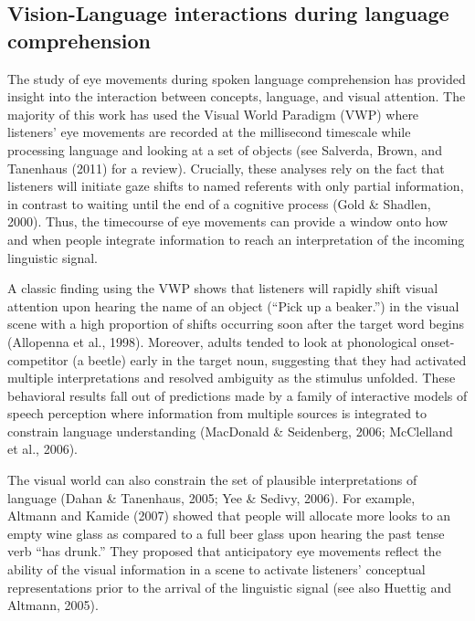 \documentclass[english,floatsintext,man]{apa6}
\begin{document}
\hypertarget{vision-language-interactions-during-language-comprehension}{%
\subsection{Vision-Language interactions during language
comprehension}\label{vision-language-interactions-during-language-comprehension}}

The study of eye movements during spoken language comprehension has
provided insight into the interaction between concepts, language, and
visual attention. The majority of this work has used the Visual World
Paradigm (VWP) where listeners' eye movements are recorded at the
millisecond timescale while processing language and looking at a set of
objects (see Salverda, Brown, and Tanenhaus (2011) for a review).
Crucially, these analyses rely on the fact that listeners will initiate
gaze shifts to named referents with only partial information, in
contrast to waiting until the end of a cognitive process (Gold \&
Shadlen, 2000). Thus, the timecourse of eye movements can provide a
window onto how and when people integrate information to reach an
interpretation of the incoming linguistic signal.

A classic finding using the VWP shows that listeners will rapidly shift
visual attention upon hearing the name of an object (\enquote{Pick up a
beaker.}) in the visual scene with a high proportion of shifts occurring
soon after the target word begins (Allopenna et al., 1998). Moreover,
adults tended to look at phonological onset-competitor (a beetle) early
in the target noun, suggesting that they had activated multiple
interpretations and resolved ambiguity as the stimulus unfolded. These
behavioral results fall out of predictions made by a family of
interactive models of speech perception where information from multiple
sources is integrated to constrain language understanding (MacDonald \&
Seidenberg, 2006; McClelland et al., 2006).

The visual world can also constrain the set of plausible interpretations
of language (Dahan \& Tanenhaus, 2005; Yee \& Sedivy, 2006). For
example, Altmann and Kamide (2007) showed that people will allocate more
looks to an empty wine glass as compared to a full beer glass upon
hearing the past tense verb \enquote{has drunk.} They proposed that
anticipatory eye movements reflect the ability of the visual information
in a scene to activate listeners' conceptual representations prior to
the arrival of the linguistic signal (see also Huettig and Altmann,
2005).
\end{document}
